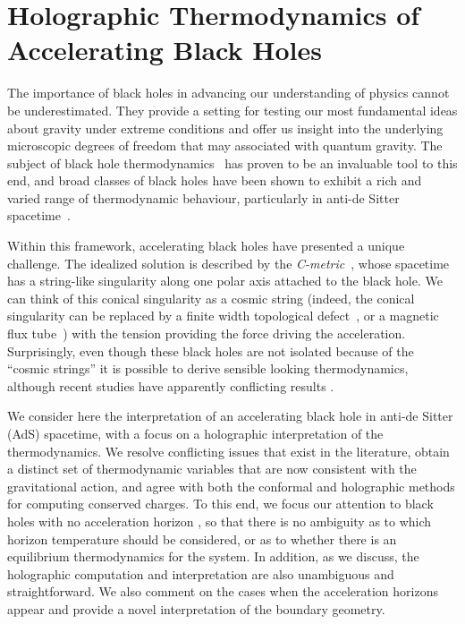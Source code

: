 \documentclass[
twoside,
openright,
frontopenright,
]{dmathesis}
\begin{document}
\chapter{Holographic Thermodynamics of Accelerating Black Holes}
\label{chap:holoTD}

The importance of black holes in advancing our understanding of physics cannot
be underestimated.  They provide a setting for testing our most fundamental
ideas about gravity under extreme conditions and offer us insight into the
underlying microscopic degrees of freedom that may associated with quantum
gravity.  The subject of black hole thermodynamics~\cite{Bekenstein:1973ur,
  Bekenstein:1974ax,Hawking:1974sw} has proven to be an invaluable tool to this
end, and broad classes of black holes have been shown to exhibit a rich and
varied range of thermodynamic behaviour, particularly in anti-de Sitter
spacetime~\cite{Kubiznak:2016qmn}.

Within this framework, accelerating black holes have presented a unique
challenge.  The idealized solution is described by the
\emph{C-metric}~\cite{Kinnersley:1970zw,
  Plebanski:1976gy,Dias:2002mi,Griffiths:2005qp}, whose spacetime has a
string-like singularity along one polar axis attached to the black hole.  We can
think of this conical singularity as a cosmic string (indeed, the conical
singularity can be replaced by a finite width topological
defect~\cite{Gregory:1995hd}, or a magnetic flux tube~\cite{Dowker:1993bt}) with
the tension providing the force driving the acceleration.  Surprisingly, even
though these black holes are not isolated because of the ``cosmic strings'' it
is possible to derive sensible looking thermodynamics, although recent studies
have apparently conflicting results
\cite{Appels:2016uha,Appels:2017xoe,Gregory:2017ogk,Astorino:2016ybm}.

We consider here the interpretation of an accelerating black hole in anti-de
Sitter (AdS) spacetime, with a focus on a holographic interpretation of the
thermodynamics. We resolve conflicting issues that exist in the literature,
obtain a distinct set of thermodynamic variables that are now consistent with
the gravitational action, and agree with both the conformal and holographic
methods for computing conserved charges. To this end, we focus our attention to
black holes with no acceleration horizon \cite{Podolsky:2002nk}, so that there
is no ambiguity as to which horizon temperature should be considered, or as to
whether there is an equilibrium thermodynamics for the system. In addition, as
we discuss, the holographic computation and interpretation are also unambiguous
and straightforward. We also comment on the cases when the acceleration horizons
appear and provide a novel interpretation of the boundary geometry.
\end{document}
